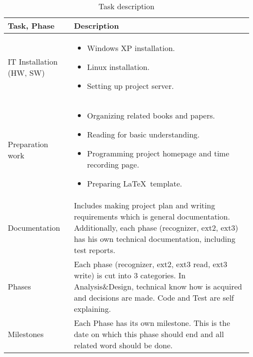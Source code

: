 \begin{longtable}{|p{3cm}|X|}
\caption{\label{tab:taskDesc}Task description}\\
\hline
\textbf{Task, Phase}				& \textbf{Description}\\
\hline
\hline
IT Installation (HW, SW)		& \begin{itemize}
															\item Windows XP installation.
															\item Linux installation.
															\item Setting up project server.
															\end{itemize}\\
\hline
Preparation work						& \begin{itemize}
															\item Organizing related books and papers.
															\item Reading for basic understanding.
															\item Programming project homepage and time recording page.
															\item Preparing \LaTeX\ template.
															\end{itemize}\\
\hline
Documentation								& Includes making project plan and writing requirements which is general documentation. Additionally, each phase (recognizer, ext2, ext3) has his own technical documentation, including test reports.\\

\hline											
Phases											& Each phase (recognizer, ext2, ext3 read, ext3 write) is cut into 3 categories. In Analysis\&Design, technical know how is acquired and decisions are made. Code and Test are self explaining.\\

\hline
Milestones									&Each Phase has its own milestone. This is the date on which this phase should end and all related word should be done.\\

\hline
\end{longtable}
